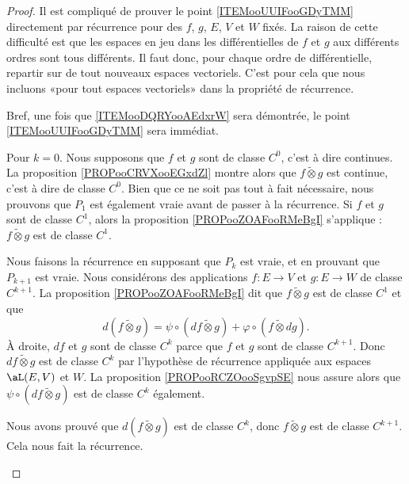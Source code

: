 \begin{proof}
	Il est compliqué de prouver le point \ref{ITEMooUUIFooGDyTMM} directement par récurrence pour des \( f\), \( g\), \( E\), \( V\) et \( W\) fixés. La raison de cette difficulté est que les espaces en jeu dans les différentielles de \( f\) et \( g\) aux différents ordres sont tous différents. Il faut donc, pour chaque ordre de différentielle, repartir sur de tout nouveaux espaces vectoriels. C'est pour cela que nous incluons «pour tout espaces vectoriels» dans la propriété de récurrence.

	Bref, une fois que \ref{ITEMooDQRYooAEdxrW} sera démontrée, le point \ref{ITEMooUUIFooGDyTMM} sera immédiat.

	\begin{subproof}
		\spitem[Pour \( k=0\)]
		Pour \( k=0\). Nous supposons que \( f\) et \( g\) sont de classe \( C^0\), c'est à dire continues. La proposition \ref{PROPooCRVXooEGxdZl} montre alors que \( f\tilde\otimes g\) est continue, c'est à dire de classe \( C^0\).
		\spitem[Pour \( k=1\)]
		Bien que ce ne soit pas tout à fait nécessaire, nous prouvons que \( P_1\) est également vraie avant de passer à la récurrence. Si \( f\) et \( g\) sont de classe \( C^1\), alors  la proposition \ref{PROPooZOAFooRMeBgI} s'applique : \( f\tilde\otimes g\) est de classe \( C^1\).

		\spitem[Pour \( k+1\)]
		Nous faisons la récurrence en supposant que \( P_k\) est vraie, et en prouvant que \( P_{k+1}\) est vraie. Nous considérons des applications  \( f\colon E\to V\) et \( g\colon E\to W\) de classe \( C^{k+1}\). La proposition \ref{PROPooZOAFooRMeBgI} dit que \( f\tilde\otimes g\) est de classe \( C^1\) et que
		\begin{equation}
			d(f\tilde\otimes g)=\psi\circ(df\tilde\otimes g)+\varphi\circ(f\tilde\otimes dg).
		\end{equation}
		À droite, \( df\) et \( g\) sont de classe \( C^k\) parce que \( f\) et \( g\) sont de classe \( C^{k+1}\). Donc \( df\tilde\otimes g\) est de classe \( C^k\) par l'hypothèse de récurrence appliquée aux espaces \( \aL(E,V)\) et \( W\). La proposition \ref{PROPooRCZOooSgvpSE} nous assure alors que \( \psi\circ(df\tilde\otimes g)\) est de classe \( C^k\) également.

		Nous avons prouvé que \( d(f\tilde\otimes g)\) est de classe \( C^k\), donc \( f\tilde\otimes g\) est de classe \( C^{k+1}\). Cela nous fait la récurrence.
	\end{subproof}
\end{proof}

